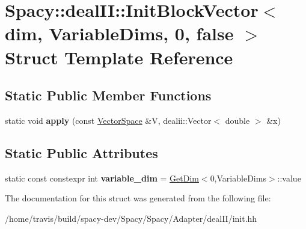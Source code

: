\hypertarget{structSpacy_1_1dealII_1_1InitBlockVector_3_01dim_00_01VariableDims_00_010_00_01false_01_4}{\section{Spacy\-:\-:deal\-I\-I\-:\-:Init\-Block\-Vector$<$ dim, Variable\-Dims, 0, false $>$ Struct Template Reference}
\label{structSpacy_1_1dealII_1_1InitBlockVector_3_01dim_00_01VariableDims_00_010_00_01false_01_4}
}
\subsection*{Static Public Member Functions}
\begin{DoxyCompactItemize}
\item 
\hypertarget{structSpacy_1_1dealII_1_1InitBlockVector_3_01dim_00_01VariableDims_00_010_00_01false_01_4_aea4cb591d2b5996e60a2f11c600069b5}{static void {\bfseries apply} (const \hyperlink{classSpacy_1_1VectorSpace}{Vector\-Space} \&V, dealii\-::\-Vector$<$ double $>$ \&x)}\label{structSpacy_1_1dealII_1_1InitBlockVector_3_01dim_00_01VariableDims_00_010_00_01false_01_4_aea4cb591d2b5996e60a2f11c600069b5}

\end{DoxyCompactItemize}
\subsection*{Static Public Attributes}
\begin{DoxyCompactItemize}
\item 
\hypertarget{structSpacy_1_1dealII_1_1InitBlockVector_3_01dim_00_01VariableDims_00_010_00_01false_01_4_a098536881bb5c87b6b93138c64274105}{static const constexpr int {\bfseries variable\-\_\-dim} = \hyperlink{structSpacy_1_1dealII_1_1GetDim}{Get\-Dim}$<$0,Variable\-Dims$>$\-::value}\label{structSpacy_1_1dealII_1_1InitBlockVector_3_01dim_00_01VariableDims_00_010_00_01false_01_4_a098536881bb5c87b6b93138c64274105}

\end{DoxyCompactItemize}


The documentation for this struct was generated from the following file\-:\begin{DoxyCompactItemize}
\item 
/home/travis/build/spacy-\/dev/\-Spacy/\-Spacy/\-Adapter/deal\-I\-I/init.\-hh\end{DoxyCompactItemize}
